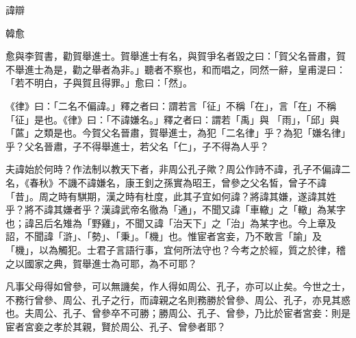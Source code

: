 諱辯

韓愈

愈與李賀書，勸賀舉進士。賀舉進士有名，與賀爭名者毀之曰：「賀父名晉肅，賀不舉進士為是，勸之舉者為非。」聽者不察也，和而唱之，同然一辭，皇甫湜曰：「若不明白，子與賀且得罪。」愈曰：「然」。

《律》曰：「二名不偏諱。」釋之者曰：謂若言「征」不稱「在」，言「在」不稱「征」是也。《律》曰：「不諱嫌名。」釋之者曰：謂若「禹」與 「雨」，「邱」與「蓲」之類是也。今賀父名晉肅，賀舉進士，為犯「二名律」乎？為犯「嫌名律」乎？父名晉肅，子不得舉進士，若父名「仁」，子不得為人乎？

夫諱始於何時？作法制以教天下者，非周公孔子歟？周公作詩不諱，孔子不偏諱二名，《春秋》不譏不諱嫌名，康王釗之孫實為昭王，曾參之父名皙，曾子不諱「昔」。周之時有騏期，漢之時有杜度，此其子宜如何諱？將諱其嫌，遂諱其姓乎？將不諱其嫌者乎？漢諱武帝名徹為「通」，不聞又諱「車轍」之「轍」為某字也；諱呂后名雉為「野雞」，不聞又諱「治天下」之「治」為某字也。今上章及詔，不聞諱「滸」、「勢」、「秉」。「機」也。惟宦者宮妾，乃不敢言「諭」及 「機」，以為觸犯。士君子言語行事，宜何所法守也？今考之於經，質之於律，稽之以國家之典，賀舉進士為可耶，為不可耶？

凡事父母得如曾參，可以無譏矣，作人得如周公、孔子，亦可以止矣。今世之士，不務行曾參、周公、孔子之行，而諱親之名則務勝於曾參、周公、孔子，亦見其惑也。夫周公、孔子、曾參卒不可勝；勝周公、孔子、曾參，乃比於宦者宮妾：則是宦者宮妾之孝於其親，賢於周公、孔子、曾參者耶？